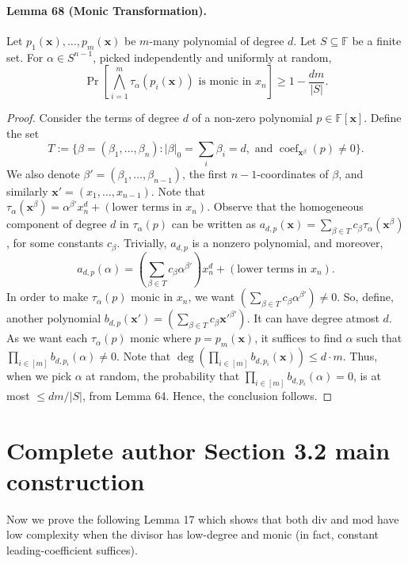 \documentclass[10pt,a4paper]{article}
\begin{document}
\paragraph{Lemma 68 (Monic Transformation).} Let $p_1(\mathbf x),\ldots,p_m(\mathbf x)$ be $m$-many polynomial of degree $d$. Let $S\subseteq\mathbb F$ be a finite set. For $\alpha\in S^{n-1}$, picked independently and uniformly at random,
\[\Pr\left[\bigwedge_{i=1}^m\tau_\alpha(p_i(\mathbf x))\text{ is monic in }x_n\right]\ge1-\frac{dm}{|S|}.\]
\begin{proof}Consider the terms of degree $d$ of a non-zero polynomial $p\in\mathbb F[\mathbf x]$. Define the set
\[T:=\{\beta=(\beta_1,\ldots,\beta_n):|\beta|_0=\sum_i\beta_i=d,\text{ and }\operatorname{coef}_{\mathbf x^\beta}(p)\ne0\}.\]
We also denote $\beta'=(\beta_1,\ldots,\beta_{n-1})$, the first $n-1$-coordinates of $\beta$, and similarly $\mathbf x'=(x_1,\ldots,x_{n-1})$. Note that $\tau_\alpha(\mathbf x^\beta)=\alpha^{\beta'}x_n^d+(\text{lower terms in }x_n)$. Observe that the homogeneous component of degree $d$ in $\tau_\alpha(p)$ can be written as $a_{d,p}(\mathbf x)=\sum_{\beta\in T}c_\beta\tau_\alpha(\mathbf x^\beta)$, for some constants $c_\beta$. Trivially, $a_{d,p}$ is a nonzero polynomial, and moreover,
\[a_{d,p}(\alpha)=\left(\sum_{\beta\in T}c_\beta\alpha^{\beta'}\right)x_n^d+(\text{lower terms in }x_n).\]
In order to make $\tau_\alpha(p)$ monic in $x_n$, we want $(\sum_{\beta\in T}c_\beta\alpha^{\beta'})\ne0$. So, define, another polynomial $b_{d,p}(\mathbf x')=(\sum_{\beta\in T}c_\beta\mathbf x'^{\beta'})$. It can have degree atmost $d$. As we want each $\tau_\alpha(p)$ monic where $p=p_m(\mathbf x)$, it suffices to find $\alpha$ such that $\prod_{i\in[m]}b_{d,p_i}(\alpha)\ne0$. Note that $\deg(\prod_{i\in[m]}b_{d,p_i}(\mathbf x))\le d\cdot m$. Thus, when we pick $\alpha$ at random, the probability that $\prod_{i\in[m]}b_{d,p_i}(\alpha)=0$, is at most $\le dm/|S|$, from Lemma 64. Hence, the conclusion follows.\end{proof}

\section*{Complete author Section 3.2 main construction}
Now we prove the following Lemma 17 which shows that both $\mathrm{div}$ and $\mathrm{mod}$ have low complexity when the divisor has low-degree and monic (in fact, constant leading-coefficient suffices).
\end{document}
